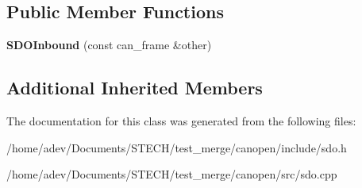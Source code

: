\subsection*{Public Member Functions}
\begin{DoxyCompactItemize}
\item 
\mbox{\label{class_c_a_nopen_1_1_s_d_o_inbound_a9ec2a9d10554f7f47aeaa5d83e048f70}} 
{\bfseries S\+D\+O\+Inbound} (const can\+\_\+frame \&other)
\end{DoxyCompactItemize}
\subsection*{Additional Inherited Members}


The documentation for this class was generated from the following files\+:\begin{DoxyCompactItemize}
\item 
/home/adev/\+Documents/\+S\+T\+E\+C\+H/test\+\_\+merge/canopen/include/sdo.\+h\item 
/home/adev/\+Documents/\+S\+T\+E\+C\+H/test\+\_\+merge/canopen/src/sdo.\+cpp\end{DoxyCompactItemize}
